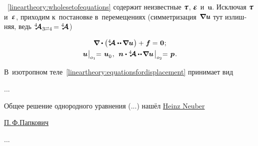 \begin{otherlanguage}{russian}

~\eqref{lineartheory:wholesetofequations} содержит неизвестные $\mathboldtau$, $\mathboldepsilon$ и~$\bm{u}$. Исключая $\mathboldtau$ и~$\mathboldepsilon$, приходим к~постановке в~перемещениях (симметризация~${\hspace{-0.2ex} \bm{\nabla}\hspace{-0.2ex} \bm{u}}$ тут излишняя, ведь ${\stiffnesstensor_{\hspace{.12ex} 3 \scalebox{0.6}[0.8]{$\rightleftarrows$} 4} \hspace{-0.2ex} = \stiffnesstensor}$)

\nopagebreak\vspace{-0.1em}\begin{equation}\label{lineartheory:equationsfordisplacement}
\begin{array}{c}
\boldnabla \dotp \left( \stiffnesstensor \dotdotp \hspace{-0.12ex} \boldnabla \bm{u} \hspace{0.1ex} \right) + \hspace{0.1ex} \bm{f} = \hspace{0.1ex} \bm{0} \hspace{0.1ex}; \\[.4em]
\bm{u} \hspace{0.1ex} \bigr|_{o_1} \hspace{-0.64ex} = \hspace{0.2ex} \bm{u}_{\raisemath{-0.1em}{0}} \hspace{0.16ex} , \:\:
\bm{n} \dotp %
\stiffnesstensor \hspace{-0.08ex} \dotdotp \hspace{-0.24ex} \boldnabla \bm{u}
\hspace{0.25ex} \bigr|_{o_2} \hspace{-0.64ex} = \hspace{0.2ex} \bm{p} \hspace{0.16ex} .
\end{array}
\end{equation}%


В~изотропном теле~\eqref{lineartheory:equationsfordisplacement} принимает вид

...

Общее решение однородного уравнения (...) нашёл \href{https://de.wikipedia.org/wiki/Heinz_Neuber}{Heinz Neuber}

\href{https://ru.wikipedia.org/wiki/%D0%9F%D0%B0%D0%BF%D0%BA%D0%BE%D0%B2%D0%B8%D1%87,_%D0%9F%D1%91%D1%82%D1%80_%D0%A4%D1%91%D0%B4%D0%BE%D1%80%D0%BE%D0%B2%D0%B8%D1%87}{П.\,Ф.\:Папкович}

...



\end{otherlanguage}

